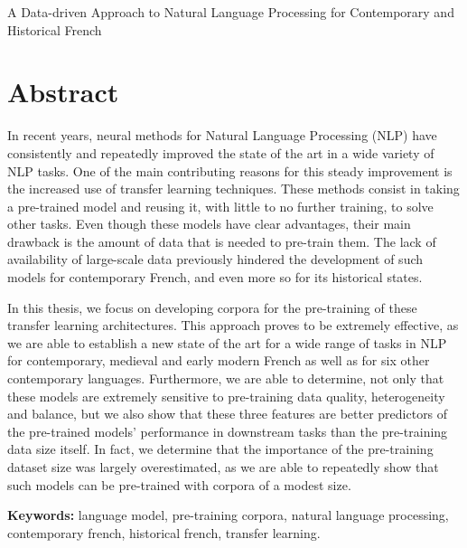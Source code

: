 \pagebreak

\begin{center}
    {\huge A Data-driven Approach to Natural Language Processing for Contemporary and Historical French}
\end{center}

\section*{Abstract}

In recent years, neural methods for Natural Language Processing (NLP) have consistently and repeatedly improved the state of the art in a wide variety of NLP tasks. One of the main contributing reasons for this steady improvement is the increased use of transfer learning techniques. These methods consist in taking a pre-trained model and reusing it, with little to no further training, to solve other tasks. Even though these models have clear advantages, their main drawback is the amount of data that is needed to pre-train them. The lack of availability of large-scale data previously hindered the development of such models for contemporary French, and even more so for its historical states.

In this thesis, we focus on developing corpora for the pre-training of these transfer learning architectures. This approach proves to be extremely effective, as we are able to establish a new state of the art for a wide range of tasks in NLP for contemporary, medieval and early modern French as well as for six other contemporary languages. Furthermore, we are able to determine, not only that these models are extremely sensitive to pre-training data quality, heterogeneity and balance, but we also show that these three features are better predictors of the pre-trained models' performance in downstream tasks than the pre-training data size itself. In fact, we determine that the importance of the pre-training dataset size was largely overestimated, as we are able to repeatedly show that such models can be pre-trained with corpora of a modest size.

\vspace{1cm}
\textbf{Keywords:} language model, pre-training corpora, natural language processing, contemporary french, historical french, transfer learning.
